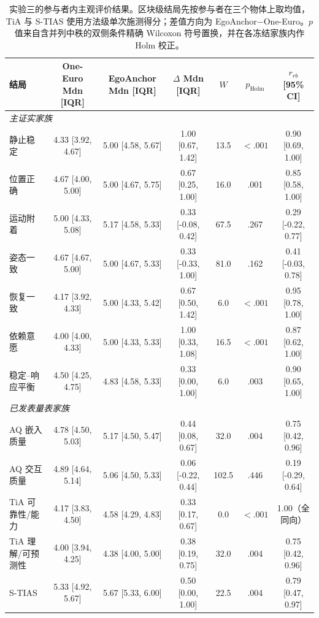 \begin{table}[t]
\centering
\caption{实验三的参与者内主观评价结果。区块级结局先按参与者在三个物体上取均值，TiA 与 S-TIAS 使用方法级单次施测得分；差值方向为 EgoAnchor$-$One-Euro。$p$ 值来自含并列中秩的双侧条件精确 Wilcoxon 符号置换，并在各冻结家族内作 Holm 校正。}
\label{tab:exp3-subjective}
\small
\setlength{\tabcolsep}{2.5pt}
\begin{tabular}{lcccccc}
\toprule
结局 & One-Euro Mdn [IQR] & EgoAnchor Mdn [IQR] & $\Delta$ Mdn [IQR] & $W$ & $p_{\mathrm{Holm}}$ & $r_{rb}$ [95\% CI] \\
\midrule
\multicolumn{7}{l}{\emph{主证实家族}} \\
静止稳定 & 4.33 [3.92, 4.67] & 5.00 [4.58, 5.67] & 1.00 [0.67, 1.42] & 13.5 & $<.001$ & 0.90 [0.69, 1.00] \\
位置正确 & 4.67 [4.00, 5.00] & 5.00 [4.67, 5.75] & 0.67 [0.25, 1.00] & 16.0 & .001 & 0.85 [0.58, 1.00] \\
运动附着 & 5.00 [4.33, 5.08] & 5.17 [4.58, 5.33] & 0.33 [-0.08, 0.42] & 67.5 & .267 & 0.29 [-0.22, 0.77] \\
姿态一致 & 4.67 [4.67, 5.00] & 5.00 [4.67, 5.33] & 0.33 [-0.33, 1.00] & 81.0 & .162 & 0.41 [-0.03, 0.78] \\
恢复一致 & 4.17 [3.92, 4.33] & 5.00 [4.33, 5.42] & 0.67 [0.50, 1.42] & 6.0 & $<.001$ & 0.95 [0.78, 1.00] \\
依赖意愿 & 4.00 [4.00, 4.33] & 5.00 [4.33, 5.33] & 1.00 [0.33, 1.08] & 16.5 & $<.001$ & 0.87 [0.62, 1.00] \\
稳定--响应平衡 & 4.50 [4.25, 4.75] & 4.83 [4.58, 5.33] & 0.33 [0.00, 1.00] & 6.0 & .003 & 0.90 [0.65, 1.00] \\
\midrule
\multicolumn{7}{l}{\emph{已发表量表家族}} \\
AQ 嵌入质量 & 4.78 [4.50, 5.03] & 5.17 [4.50, 5.47] & 0.44 [0.08, 0.67] & 32.0 & .004 & 0.75 [0.42, 0.96] \\
AQ 交互质量 & 4.89 [4.64, 5.14] & 5.06 [4.50, 5.33] & 0.06 [-0.22, 0.44] & 102.5 & .446 & 0.19 [-0.29, 0.64] \\
TiA 可靠性/能力 & 4.17 [3.83, 4.50] & 4.58 [4.29, 4.83] & 0.33 [0.17, 0.67] & 0.0 & $<.001$ & 1.00（全同向） \\
TiA 理解/可预测性 & 4.00 [3.94, 4.25] & 4.38 [4.00, 5.00] & 0.38 [0.19, 0.75] & 32.0 & .004 & 0.75 [0.42, 0.96] \\
S-TIAS & 5.33 [4.92, 5.67] & 5.67 [5.33, 6.00] & 0.50 [0.00, 1.00] & 22.5 & .004 & 0.79 [0.47, 0.97] \\
\bottomrule
\end{tabular}
\end{table}
